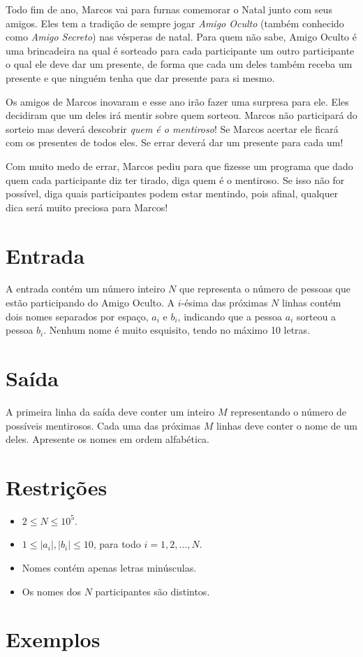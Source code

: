 Todo fim de ano, Marcos vai para furnas comemorar o Natal junto com seus amigos.
Eles tem a tradição de sempre jogar \textit{Amigo Oculto} (também conhecido como 
\textit{Amigo Secreto}) nas vésperas de natal. Para quem não sabe, Amigo Oculto
é uma brincadeira na qual é sorteado para cada participante um outro participante
o qual ele deve dar um presente, de forma que cada um deles também receba um presente e que ninguém tenha que dar presente para si mesmo. 

Os amigos de Marcos inovaram e esse ano irão fazer uma surpresa para ele. Eles decidiram
que um deles irá mentir sobre quem sorteou. Marcos não participará do sorteio mas
deverá descobrir \textit{quem é o mentiroso}! Se Marcos acertar ele ficará com os
presentes de todos eles. Se errar deverá dar um presente para cada um! 

Com muito medo de errar, Marcos pediu para que fizesse um programa que dado quem
cada participante diz ter tirado, diga quem é o mentiroso. Se isso não for possível,
diga quais participantes podem estar mentindo, pois afinal, qualquer dica será
muito preciosa para Marcos!

\section*{Entrada}

A entrada contém um número inteiro $N$ que representa o número de pessoas que estão
participando do Amigo Oculto. A $i$-ésima das próximas $N$ linhas contém dois nomes separados por espaço, $a_i$ e $b_i$,
indicando que a pessoa $a_i$ sorteou a pessoa $b_i$.
Nenhum nome é muito esquisito, tendo no máximo 10 letras.

\section*{Saída}

A primeira linha da saída deve conter um inteiro $M$ representando o número de possíveis mentirosos. Cada uma das próximas $M$ linhas deve
conter o nome de um deles. Apresente os nomes em ordem alfabética.

\section*{Restrições}

\begin{itemize}
\item $2 \le N \le 10^5$.
\item $1 \le |a_i|, |b_i| \le 10$, para todo $i=1,2,\ldots,N$.
\item Nomes contém apenas letras minúsculas. 
\item Os nomes dos $N$ participantes são distintos.
\end{itemize}

\section*{Exemplos}

\exemplo
